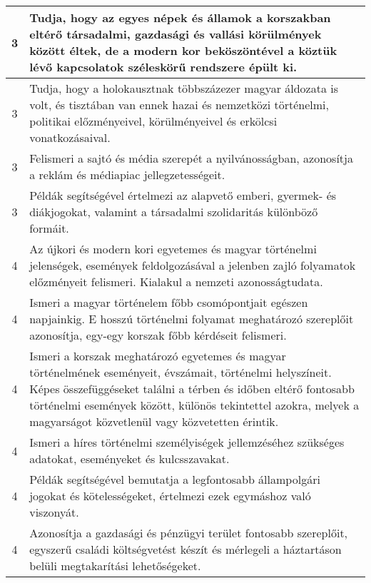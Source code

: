 \begin{longtable}{c | p{} }
                                
                                          3 &  Tudja, hogy az egyes népek és államok a korszakban eltérő társadalmi, gazdasági és vallási körülmények között éltek, de a modern kor beköszöntével a köztük lévő kapcsolatok széleskörű rendszere épült ki. \\ \hline
                                          3 &  Tudja, hogy a holokausztnak többszázezer magyar áldozata is volt, és  tisztában van ennek hazai és nemzetközi történelmi, politikai előzményeivel, körülményeivel és erkölcsi vonatkozásaival. \\ \hline
                                          3 &  Felismeri a sajtó és média szerepét a nyilvánosságban, azonosítja a reklám és médiapiac jellegzetességeit. \\ \hline
                                          3 &  Példák segítségével értelmezi az alapvető emberi, gyermek- és diákjogokat, valamint a társadalmi szolidaritás különböző formáit. \\ \hline
                                      
                                
                                          4 &  Az újkori és modern kori egyetemes és magyar történelmi jelenségek, események feldolgozásával a jelenben zajló folyamatok előzményeit felismeri. Kialakul a nemzeti azonosságtudata. \\ \hline
                                          4 &  Ismeri a magyar történelem főbb csomópontjait egészen napjainkig. E hosszú történelmi folyamat meghatározó szereplőit azonosítja, egy-egy korszak főbb kérdéseit felismeri. \\ \hline
                                          4 &  Ismeri a korszak meghatározó egyetemes és magyar történelmének eseményeit, évszámait, történelmi helyszíneit. Képes összefüggéseket találni a térben és időben eltérő fontosabb történelmi események között, különös tekintettel azokra, melyek a magyarságot közvetlenül vagy közvetetten érintik. \\ \hline
                                          4 &  Ismeri a híres történelmi személyiségek jellemzéséhez szükséges adatokat, eseményeket és kulcsszavakat. \\ \hline
                                          4 &  Példák segítségével bemutatja a legfontosabb állampolgári jogokat és kötelességeket, értelmezi ezek egymáshoz való viszonyát. \\ \hline
                                          4 &  Azonosítja a gazdasági és pénzügyi terület fontosabb szereplőit, egyszerű családi költségvetést készít és mérlegeli a háztartáson belüli megtakarítási lehetőségeket. \\ \hline
                                      
                        \end{longtable}
            \clearpage

